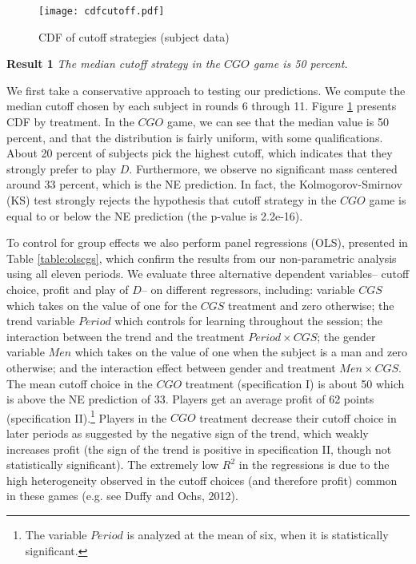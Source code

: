 \documentclass[11pt,english]{article}
\begin{document}
\begin{center}
\begin{figure}[ht]
\centering{}%
\texttt{[image: cdfcutoff.pdf]}%
\caption{CDF of cutoff strategies (subject data) \\ } 
\label{fig:allcutoff}
\end{figure}
\par\end{center}

\noindent \textbf{Result 1}
\textit{The median cutoff strategy in the $CGO$ game is 50 percent.}

We first take a conservative approach to testing our predictions. We compute the median cutoff chosen by each subject in rounds 6 through 11. Figure  \ref{fig:allcutoff} presents CDF by treatment. In the $CGO$ game, we can see that the median value is 50 percent, and that the distribution is fairly uniform, with some qualifications. About 20 percent of subjects pick the highest cutoff, which indicates that they strongly prefer to play $D$. Furthermore, we observe no significant mass centered around 33 percent, which is the NE prediction. In fact, the Kolmogorov-Smirnov (KS) test strongly rejects the hypothesis that cutoff strategy in the $CGO$ game is equal to or below the NE prediction (the p-value is 2.2e-16).

To control for group effects we also perform panel regressions (OLS), presented in Table \ref{table:olscgs}, which confirm the results from our non-parametric analysis using all eleven periods. We evaluate three alternative dependent variables-- cutoff choice, profit and play of $D$--  on different regressors, including: variable $CGS$ which takes on the value of one for the $CGS$ treatment and zero otherwise; the trend variable $Period$ which controls for learning throughout the session; the interaction between the trend and the treatment $Period \times CGS$; the gender variable $Men$ which takes on the value of one when the subject is a man and zero otherwise; and the interaction effect between gender and treatment $Men \times CGS$. The mean cutoff choice in the $CGO$ treatment (specification I) is about 50 which is above the NE prediction of 33. Players get an average profit of 62 points (specification II).\footnote{The variable $Period$ is analyzed at the mean of six, when it is statistically significant.} Players in the $CGO$ treatment decrease their cutoff choice in later periods as suggested by the negative sign of the trend, which weakly increases profit (the sign of the trend is positive in specification II, though not statistically significant). The extremely low $R^2$ in the regressions is due to the high heterogeneity observed in the cutoff choices (and therefore profit) common in these games (e.g. see Duffy and Ochs, 2012).\\
\end{document}
